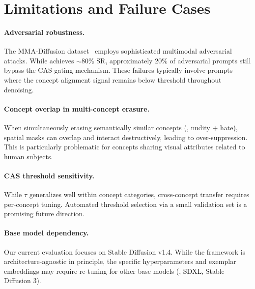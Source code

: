 \section{Limitations and Failure Cases}
\label{app:limitations}

\paragraph{Adversarial robustness.} The MMA-Diffusion dataset~\citep{yang2024mma} employs sophisticated multimodal adversarial attacks. While \ours{} achieves $\sim$80\% SR, approximately 20\% of adversarial prompts still bypass the CAS gating mechanism. These failures typically involve prompts where the concept alignment signal remains below threshold throughout denoising.

\paragraph{Concept overlap in multi-concept erasure.} When simultaneously erasing semantically similar concepts (\eg, nudity + hate), spatial masks can overlap and interact destructively, leading to over-suppression. This is particularly problematic for concepts sharing visual attributes related to human subjects.

\paragraph{CAS threshold sensitivity.} While $\tau$ generalizes well within concept categories, cross-concept transfer requires per-concept tuning. Automated threshold selection via a small validation set is a promising future direction.

\paragraph{Base model dependency.} Our current evaluation focuses on Stable Diffusion v1.4. While the framework is architecture-agnostic in principle, the specific hyperparameters and exemplar embeddings may require re-tuning for other base models (\eg, SDXL, Stable Diffusion 3).
